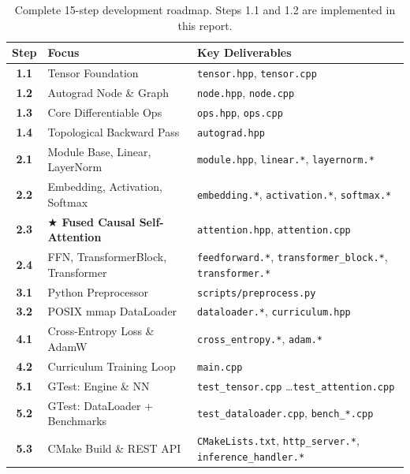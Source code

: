 \documentclass[12pt, a4paper]{article}
\begin{document}
\begin{table}[!ht]
\centering
\renewcommand{\arraystretch}{1.3}
\begin{tabularx}{\textwidth}{@{} c l L @{}}
\toprule
\textbf{Step} & \textbf{Focus} & \textbf{Key Deliverables} \\
\midrule
\textbf{1.1} & Tensor Foundation          & \texttt{tensor.hpp}, \texttt{tensor.cpp} \\
\textbf{1.2} & Autograd Node \& Graph     & \texttt{node.hpp}, \texttt{node.cpp} \\
\textbf{1.3} & Core Differentiable Ops    & \texttt{ops.hpp}, \texttt{ops.cpp} \\
\textbf{1.4} & Topological Backward Pass  & \texttt{autograd.hpp} \\
\midrule
\textbf{2.1} & Module Base, Linear, LayerNorm & \texttt{module.hpp}, \texttt{linear.*}, \texttt{layernorm.*} \\
\textbf{2.2} & Embedding, Activation, Softmax & \texttt{embedding.*}, \texttt{activation.*}, \texttt{softmax.*} \\
\textbf{2.3} & \textbf{\textcolor{engineblue}{\(\bigstar\) Fused Causal Self-Attention}} & \texttt{attention.hpp}, \texttt{attention.cpp} \\
\textbf{2.4} & FFN, TransformerBlock, Transformer & \texttt{feedforward.*}, \texttt{transformer\_block.*}, \texttt{transformer.*} \\
\midrule
\textbf{3.1} & Python Preprocessor        & \texttt{scripts/preprocess.py} \\
\textbf{3.2} & POSIX mmap DataLoader      & \texttt{dataloader.*}, \texttt{curriculum.hpp} \\
\midrule
\textbf{4.1} & Cross-Entropy Loss \& AdamW & \texttt{cross\_entropy.*}, \texttt{adam.*} \\
\textbf{4.2} & Curriculum Training Loop   & \texttt{main.cpp} \\
\midrule
\textbf{5.1} & GTest: Engine \& NN        & \texttt{test\_tensor.cpp} \ldots \texttt{test\_attention.cpp} \\
\textbf{5.2} & GTest: DataLoader + Benchmarks & \texttt{test\_dataloader.cpp}, \texttt{bench\_*.cpp} \\
\textbf{5.3} & CMake Build \& REST API    & \texttt{CMakeLists.txt}, \texttt{http\_server.*}, \texttt{inference\_handler.*} \\
\bottomrule
\end{tabularx}
\caption{Complete 15-step development roadmap. Steps 1.1 and 1.2 are implemented in this report.}
\end{table}
\end{document}
